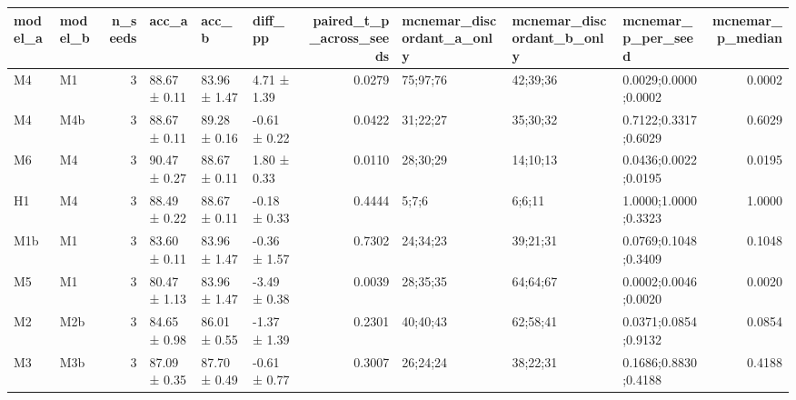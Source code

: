 \begin{tabular}{llrlllrlllr}
\toprule
model\_a & model\_b & n\_seeds & acc\_a & acc\_b & diff\_pp & paired\_t\_p\_across\_seeds & mcnemar\_discordant\_a\_only & mcnemar\_discordant\_b\_only & mcnemar\_p\_per\_seed & mcnemar\_p\_median \\
\midrule
M4 & M1 & 3 & 88.67 ± 0.11 & 83.96 ± 1.47 & 4.71 ± 1.39 & 0.0279 & 75;97;76 & 42;39;36 & 0.0029;0.0000;0.0002 & 0.0002 \\
M4 & M4b & 3 & 88.67 ± 0.11 & 89.28 ± 0.16 & -0.61 ± 0.22 & 0.0422 & 31;22;27 & 35;30;32 & 0.7122;0.3317;0.6029 & 0.6029 \\
M6 & M4 & 3 & 90.47 ± 0.27 & 88.67 ± 0.11 & 1.80 ± 0.33 & 0.0110 & 28;30;29 & 14;10;13 & 0.0436;0.0022;0.0195 & 0.0195 \\
H1 & M4 & 3 & 88.49 ± 0.22 & 88.67 ± 0.11 & -0.18 ± 0.33 & 0.4444 & 5;7;6 & 6;6;11 & 1.0000;1.0000;0.3323 & 1.0000 \\
M1b & M1 & 3 & 83.60 ± 0.11 & 83.96 ± 1.47 & -0.36 ± 1.57 & 0.7302 & 24;34;23 & 39;21;31 & 0.0769;0.1048;0.3409 & 0.1048 \\
M5 & M1 & 3 & 80.47 ± 1.13 & 83.96 ± 1.47 & -3.49 ± 0.38 & 0.0039 & 28;35;35 & 64;64;67 & 0.0002;0.0046;0.0020 & 0.0020 \\
M2 & M2b & 3 & 84.65 ± 0.98 & 86.01 ± 0.55 & -1.37 ± 1.39 & 0.2301 & 40;40;43 & 62;58;41 & 0.0371;0.0854;0.9132 & 0.0854 \\
M3 & M3b & 3 & 87.09 ± 0.35 & 87.70 ± 0.49 & -0.61 ± 0.77 & 0.3007 & 26;24;24 & 38;22;31 & 0.1686;0.8830;0.4188 & 0.4188 \\
\bottomrule
\end{tabular}
